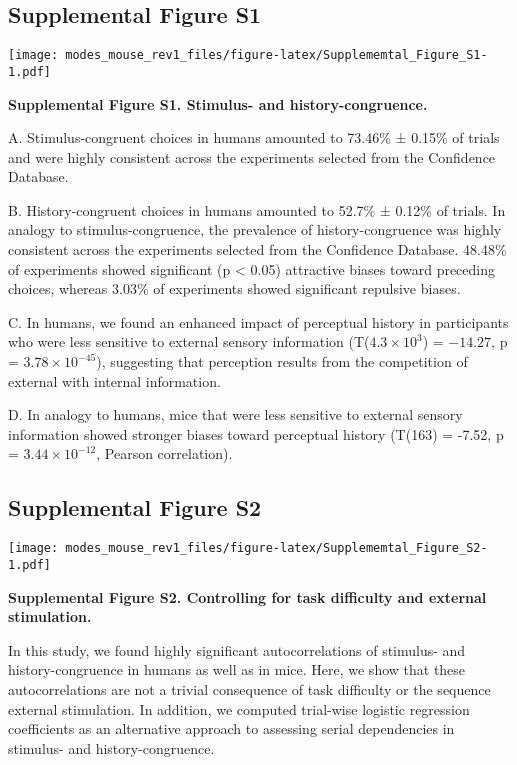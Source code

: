 \documentclass[
]{article}
\begin{document}
\hypertarget{supplemental-figure-s1}{%
\subsection{Supplemental Figure S1}\label{supplemental-figure-s1}}

\texttt{[image: modes\_mouse\_rev1\_files/figure-latex/Supplememtal\_Figure\_S1-1.pdf]}

\textbf{Supplemental Figure S1. Stimulus- and history-congruence.}

A. Stimulus-congruent choices in humans amounted to 73.46\% ± 0.15\% of
trials and were highly consistent across the experiments selected from
the Confidence Database.

B. History-congruent choices in humans amounted to 52.7\% ± 0.12\% of
trials. In analogy to stimulus-congruence, the prevalence of
history-congruence was highly consistent across the experiments selected
from the Confidence Database. 48.48\% of experiments showed significant
(p \textless{} 0.05) attractive biases toward preceding choices, whereas
3.03\% of experiments showed significant repulsive biases.

C. In humans, we found an enhanced impact of perceptual history in
participants who were less sensitive to external sensory information
(T(\(\ensuremath{4.3\times 10^{3}}\)) = \(-14.27\), p =
\(\ensuremath{3.78\times 10^{-45}}\)), suggesting that perception
results from the competition of external with internal information.

D. In analogy to humans, mice that were less sensitive to external
sensory information showed stronger biases toward perceptual history
(T(163) = -7.52, p = \(\ensuremath{3.44\times 10^{-12}}\), Pearson
correlation).

\newpage

\hypertarget{supplemental-figure-s2}{%
\subsection{Supplemental Figure S2}\label{supplemental-figure-s2}}

\texttt{[image: modes\_mouse\_rev1\_files/figure-latex/Supplememtal\_Figure\_S2-1.pdf]}

\textbf{Supplemental Figure S2. Controlling for task difficulty and
external stimulation.}

In this study, we found highly significant autocorrelations of stimulus-
and history-congruence in humans as well as in mice. Here, we show that
these autocorrelations are not a trivial consequence of task difficulty
or the sequence external stimulation. In addition, we computed
trial-wise logistic regression coefficients as an alternative approach
to assessing serial dependencies in stimulus- and history-congruence.
\end{document}
